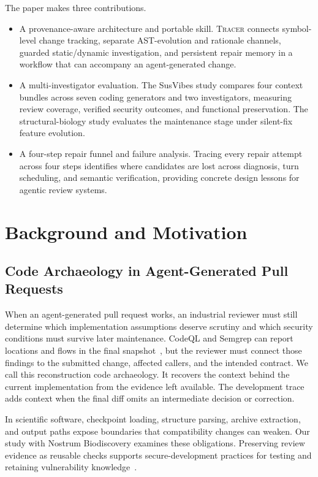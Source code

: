 \documentclass[10pt,conference]{IEEEtran}
\newcommand{\tracer}{\textsc{Tracer}}
\begin{document}
The paper makes three contributions.
\begin{itemize}
\item A provenance-aware architecture and portable skill. \tracer{} connects symbol-level change tracking, separate AST-evolution and rationale channels, guarded static/dynamic investigation, and persistent repair memory in a workflow that can accompany an agent-generated change.
\item A multi-investigator evaluation. The SusVibes study compares four context bundles across seven coding generators and two investigators, measuring review coverage, verified security outcomes, and functional preservation. The structural-biology study evaluates the maintenance stage under silent-fix feature evolution.
\item A four-step repair funnel and failure analysis. Tracing every repair attempt across four steps identifies where candidates are lost across diagnosis, turn scheduling, and semantic verification, providing concrete design lessons for agentic review systems.
\end{itemize}

\section{Background and Motivation}
\label{sec:motivation}
\subsection{Code Archaeology in Agent-Generated Pull Requests}
When an agent-generated pull request works, an industrial reviewer must still determine which implementation assumptions deserve scrutiny and which security conditions must survive later maintenance. CodeQL and Semgrep can report locations and flows in the final snapshot~\cite{codeql,semgrep}, but the reviewer must connect those findings to the submitted change, affected callers, and the intended contract. We call this reconstruction code archaeology. It recovers the context behind the current implementation from the evidence left available. The development trace adds context when the final diff omits an intermediate decision or correction.

In scientific software, checkpoint loading, structure parsing, archive extraction, and output paths expose boundaries that compatibility changes can weaken. Our study with Nostrum Biodiscovery examines these obligations. Preserving review evidence as reusable checks supports secure-development practices for testing and retaining vulnerability knowledge~\cite{ssdf}.
\end{document}
